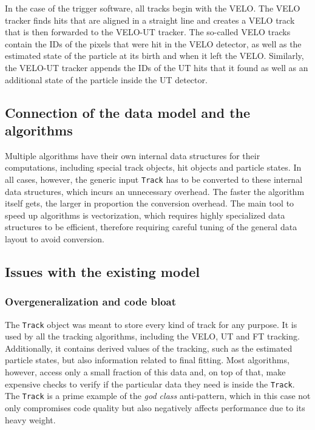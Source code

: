 \documentclass[12pt]{article}
\newcommand{\code}[1]{\texttt{#1}}
\begin{document}
In the case of the trigger software, all tracks begin with the VELO. The VELO tracker finds hits that are aligned in a straight line and creates a VELO track that is then forwarded to the VELO-UT tracker. The so-called VELO tracks contain the IDs of the pixels that were hit in the VELO detector, as well as the estimated state of the particle at its birth and when it left the VELO. Similarly, the VELO-UT tracker appends the IDs of the UT hits that it found as well as an additional state of the particle inside the UT detector.


\subsection{Connection of the data model and the algorithms}

Multiple algorithms have their own internal data structures for their computations, including special track objects, hit objects and particle states. In all cases, however, the generic input \code{Track} has to be converted to these internal data structures, which incurs an unnecessary overhead. The faster the algorithm itself gets, the larger in proportion the conversion overhead. The main tool to speed up algorithms is vectorization, which requires highly specialized data structures to be efficient, therefore requiring careful tuning of the general data layout to avoid conversion.

\subsection{Issues with the existing model}\label{sec_datamodel_issues}

\subsubsection{Overgeneralization and code bloat}

The \code{Track} object was meant to store every kind of track for any purpose. It is used by all the tracking algorithms, including the VELO, UT and FT tracking. Additionally, it contains derived values of the tracking, such as the estimated particle states, but also information related to final fitting. Most algorithms, however, access only a small fraction of this data and, on top of that, make expensive checks to verify if the particular data they need is inside the \code{Track}. The \code{Track} is a prime example of the \textit{god class} anti-pattern\cite{god_class_wiki}, which in this case not only compromises code quality but also negatively affects performance due to its heavy weight.
\end{document}
